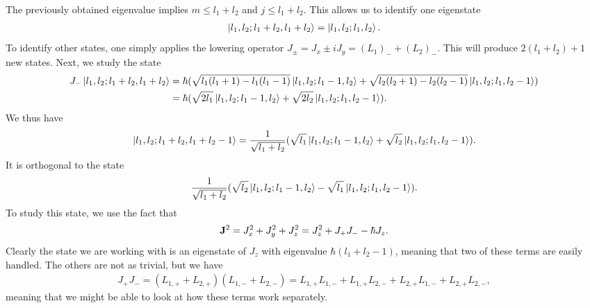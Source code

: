 The previously obtained eigenvalue implies $m \leq l_{1} + l_{2}$ and $j \leq l_{1} + l_{2}$. This allows us to identify one eigenstate
\begin{align*}
	\ket{l_{1}, l_{2}; l_{1} + l_{2}, l_{1} + l_{2}} = \ket{l_{1}, l_{2}; l_{1}, l_{2}}.
\end{align*}
To identify other states, one simply applies the lowering operator $J_{\pm} = J_{x}\pm iJ_{y} = (L_{1})_{-} + (L_{2})_{-}$. This will produce $2(l_{1} + l_{2}) + 1$ new states. Next, we study the state
\begin{align*}
	J_{-}\ket{l_{1}, l_{2}; l_{1} + l_{2}, l_{1} + l_{2}} &= \hbar(\sqrt{l_{1}(l_{1} + 1) - l_{1}(l_{1} - 1)}\ket{l_{1}, l_{2}; l_{1} - 1, l_{2}} + \sqrt{l_{2}(l_{2} + 1) - l_{2}(l_{2} - 1)}\ket{l_{1}, l_{2}; l_{1}, l_{2} - 1}) \\
	                                                      &= \hbar(\sqrt{2l_{1}}\ket{l_{1}, l_{2}; l_{1} - 1, l_{2}} + \sqrt{2l_{2}}\ket{l_{1}, l_{2}; l_{1}, l_{2} - 1}).
\end{align*}
We thus have
\begin{align*}
	\ket{l_{1}, l_{2}; l_{1} + l_{2}, l_{1} + l_{2} - 1} = \frac{1}{\sqrt{l_{1} + l_{2}}}(\sqrt{l_{1}}\ket{l_{1}, l_{2}; l_{1} - 1, l_{2}} + \sqrt{l_{2}}\ket{l_{1}, l_{2}; l_{1}, l_{2} - 1}).
\end{align*}
It is orthogonal to the state
\begin{align*}
	\frac{1}{\sqrt{l_{1} + l_{2}}}(\sqrt{l_{2}}\ket{l_{1}, l_{2}; l_{1} - 1, l_{2}} - \sqrt{l_{1}}\ket{l_{1}, l_{2}; l_{1}, l_{2} - 1}).
\end{align*}
To study this state, we use the fact that
\begin{align*}
	\vb{J}^{2} = J_{x}^{2} + J_{y}^{2} + J_{z}^{2} = J_{z}^{2} + J_{+}J_{-} - \hbar J_{z}.
\end{align*}
Clearly the state we are working with is an eigenstate of $J_{z}$ with eigenvalue $\hbar(l_{1} + l_{2} - 1)$, meaning that two of these terms are easily handled. The others are not as trivial, but we have
\begin{align*}
	J_{+}J_{-} = (L_{1, +} + L_{2, +})(L_{1, -} + L_{2, -}) = L_{1, +}L_{1, -} + L_{1, +}L_{2, -} + L_{2, +}L_{1, -} + L_{2, +}L_{2, -},
\end{align*}
meaning that we might be able to look at how these terms work separately.

